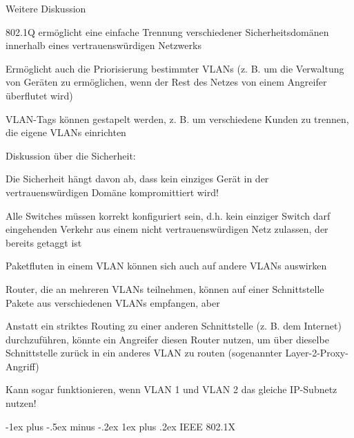 \documentclass[a4paper]{article}
\makeatletter
\renewcommand{\subsubsection}{\@startsection{subsubsection}{3}{0mm}%
 {-1ex plus -.5ex minus -.2ex}%
 {1ex plus .2ex}%
 {\normalfont\small\bfseries}}
\makeatother
\begin{document}
\begin{multicols}{3}
      Weitere Diskussion

      \begin{itemize*}
            \item
            802.1Q ermöglicht eine einfache Trennung verschiedener
            Sicherheitsdomänen innerhalb eines vertrauenswürdigen Netzwerks

            \begin{itemize*}
                  \item Ermöglicht auch die Priorisierung bestimmter VLANs (z. B. um die Verwaltung von Geräten zu ermöglichen, wenn der Rest des Netzes von einem Angreifer überflutet wird)
                  \item VLAN-Tags können gestapelt werden, z. B. um verschiedene Kunden zu trennen, die eigene VLANs einrichten
            \end{itemize*}
            \item
            Diskussion über die Sicherheit:

            \begin{itemize*}
                  \item Die Sicherheit hängt davon ab, dass kein einziges Gerät in der vertrauenswürdigen Domäne kompromittiert wird!
                  \item Alle Switches müssen korrekt konfiguriert sein, d.h. kein einziger Switch darf eingehenden Verkehr aus einem nicht vertrauenswürdigen Netz zulassen, der bereits getaggt ist
                  \item Paketfluten in einem VLAN können sich auch auf andere VLANs auswirken
                  \item Router, die an mehreren VLANs teilnehmen, können auf einer Schnittstelle Pakete aus verschiedenen VLANs empfangen, aber
                  \item Anstatt ein striktes Routing zu einer anderen Schnittstelle (z. B. dem Internet) durchzuführen, könnte ein Angreifer diesen Router nutzen, um über dieselbe Schnittstelle zurück in ein anderes VLAN zu routen (sogenannter Layer-2-Proxy-Angriff)
                  \item Kann sogar funktionieren, wenn VLAN 1 und VLAN 2 das gleiche IP-Subnetz nutzen!
            \end{itemize*}
      \end{itemize*}


      \subsubsection{IEEE 802.1X}


\end{multicols}
\end{document}
